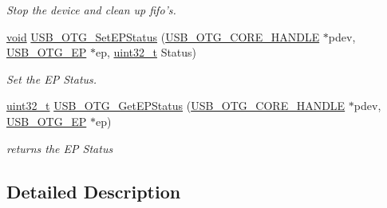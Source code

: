 \begin{DoxyCompactItemize}
\begin{DoxyCompactList}\small\item\em Stop the device and clean up fifo's. \end{DoxyCompactList}\item 
\hyperlink{group___n_a_m_e_ga18028b8badbf1ea7e704ccac3c488e82}{void} \hyperlink{group___u_s_b___c_o_r_e___exported___functions_prototype_gaca7534ae754eb0ec9bd8b9c0674405de}{U\-S\-B\-\_\-\-O\-T\-G\-\_\-\-Set\-E\-P\-Status} (\hyperlink{group___u_s_b___c_o_r_e___exported___types_gaf76054c11eb8a3367907aad7ae700e80}{U\-S\-B\-\_\-\-O\-T\-G\-\_\-\-C\-O\-R\-E\-\_\-\-H\-A\-N\-D\-L\-E} $\ast$pdev, \hyperlink{group___u_s_b___c_o_r_e___exported___types_gad1c65925021e8dac88858e10bb2a7eea}{U\-S\-B\-\_\-\-O\-T\-G\-\_\-\-E\-P} $\ast$ep, \hyperlink{stdint_8h_a435d1572bf3f880d55459d9805097f62}{uint32\-\_\-t} Status)
\begin{DoxyCompactList}\small\item\em Set the E\-P Status. \end{DoxyCompactList}\item 
\hyperlink{stdint_8h_a435d1572bf3f880d55459d9805097f62}{uint32\-\_\-t} \hyperlink{group___u_s_b___c_o_r_e___exported___functions_prototype_ga76441e00ea618894565f3980b2786119}{U\-S\-B\-\_\-\-O\-T\-G\-\_\-\-Get\-E\-P\-Status} (\hyperlink{group___u_s_b___c_o_r_e___exported___types_gaf76054c11eb8a3367907aad7ae700e80}{U\-S\-B\-\_\-\-O\-T\-G\-\_\-\-C\-O\-R\-E\-\_\-\-H\-A\-N\-D\-L\-E} $\ast$pdev, \hyperlink{group___u_s_b___c_o_r_e___exported___types_gad1c65925021e8dac88858e10bb2a7eea}{U\-S\-B\-\_\-\-O\-T\-G\-\_\-\-E\-P} $\ast$ep)
\begin{DoxyCompactList}\small\item\em returns the E\-P Status \end{DoxyCompactList}\end{DoxyCompactItemize}


\subsection{Detailed Description}


